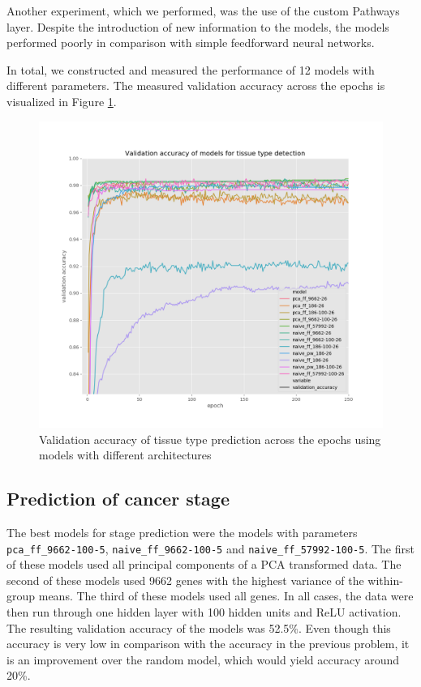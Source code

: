 Another experiment, which we performed, was the use of the custom Pathways layer.
Despite the introduction of new information to the models, the models performed poorly in comparison with simple feedforward neural networks.

In total, we constructed and measured the performance of 12 models with different parameters.
The measured validation accuracy across the epochs is visualized in Figure \ref{fig:val_acc_tt}.

\begin{figure}
    \centering
    \includegraphics[width=\linewidth]{images/val_acc_tt_v2.png}
    \caption[Validation accuracy - tissue type]{Validation accuracy of tissue type prediction across the epochs using models with different architectures}
    \label{fig:val_acc_tt}
\end{figure}

\subsection{Prediction of cancer stage}
The best models for stage prediction were the models with parameters \verb'pca_ff_9662-100-5', \verb'naive_ff_9662-100-5' and \verb'naive_ff_57992-100-5'.
The first of these models used all principal components of a PCA transformed data.
The second of these models used 9662 genes with the highest variance of the within-group means.
The third of these models used all genes.
In all cases, the data were then run through one hidden layer with 100 hidden units and ReLU activation.
The resulting validation accuracy of the models was 52.5\%.
Even though this accuracy is very low in comparison with the accuracy in the previous problem, it is an improvement over the random model, which would yield accuracy around 20\%.

